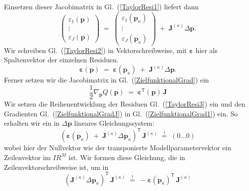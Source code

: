 Einsetzen dieser Jacobimatrix in Gl.~(\ref{TaylorResi1}) liefert dann
\begin{equation}
\left(\begin{array}{c}
\varepsilon_1(\mathbf{p}) \\
\vdots \\
\varepsilon_J(\mathbf{p}) 
\end{array}\right)
\; = \; 
\left(\begin{array}{c}
\varepsilon_1(\mathbf{p}_\kappa) \\
\vdots \\
\varepsilon_J(\mathbf{p}_\kappa)
\end{array}\right)
\; + \; \boldsymbol{J}^{(\kappa)} \Delta \mathbf{p} .
\label{TaylorResi2}
\end{equation}
Wir schreiben Gl.~(\ref{TaylorResi2}) in Vektorschreibweise, mit $\boldsymbol{\varepsilon}$ hier als Spaltenvektor
der einzelnen Residuen.
\begin{equation}
\boldsymbol{\varepsilon}(\mathbf{p})
\; = \; 
\boldsymbol{\varepsilon}(\mathbf{p}_\kappa)
\; + \; \boldsymbol{J}^{(\kappa)} \Delta \mathbf{p} .
\label{TaylorResi3}
\end{equation}
Ferner setzen wir die Jacobimatrix in Gl.~(\ref{ZielfunktionalGrad}) ein
\begin{equation}
\frac{1}{2} \nabla_{\mathbf{p}} Q(\mathbf{p})  \; = \; \boldsymbol{\varepsilon}^\textsf{T}(\mathbf{p})
 \, \boldsymbol{J}
\label{ZielfunktionalGradJ}
\end{equation}
Wir setzen die Reihenentwicklung der Residuen Gl.~(\ref{TaylorResi3}) ein und 
den Gradienten Gl.~(\ref{ZielfunktionalGradJ}) in Gl.~(\ref{ZielfunktionalGrad1}) ein.
So erhalten wir ein in $\Delta \mathbf{p}$ lineares Gleichungssystem:
\begin{equation}
\left( \boldsymbol{\varepsilon}(\mathbf{p}_\kappa)
\; + \; \boldsymbol{J}^{(\kappa)} \Delta \mathbf{p}_\kappa \right)^\textsf{T} \, \boldsymbol{J}^{(\kappa)}
\; \overset{!}{=} \; \left( 0 \dots  0 \right)
\label{GradientQlinGl1}
\end{equation}
wobei hier der Nullvektor wie der transponierte Modellparametervektor ein
Zeilenvektor im $I \! \! R^{M}$ ist.
Wir formen diese Gleichung, die in Zeilenvektorschreibweise ist, um in
\begin{equation}
\left( \boldsymbol{J}^{(\kappa)} \Delta \mathbf{p}_\kappa \right)^\textsf{T} \, \boldsymbol{J}^{(\kappa)}
\; \overset{!}{=} \; 
- \boldsymbol{\varepsilon}(\mathbf{p}_\kappa)^\textsf{T} \, \boldsymbol{J}^{(\kappa)}
\label{GradientQlinGl2}
\end{equation}
